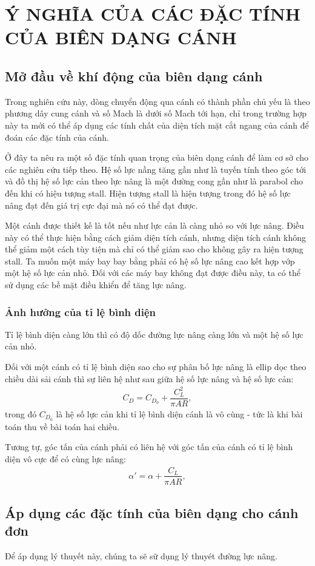 \documentclass[a4paper]{extbook}
\begin{document}
\chapter{Ý NGHĨA CỦA CÁC ĐẶC TÍNH CỦA BIÊN DẠNG CÁNH}

\section{Mở đầu về khí động của biên dạng cánh}

Trong nghiên cứu này, dòng chuyển động qua cánh có thành phần chủ yếu là theo phương dây cung cánh và số Mach là dưới số Mach tới hạn, chỉ trong trường hợp này ta mới có thể áp dụng các tính chất của diện tích mặt cắt ngang của cánh để đoán các đặc tính của cánh.

Ở đây ta nêu ra một số đặc tính quan trọng của biên dạng cánh để làm cơ sở cho các nghiên cứu tiếp theo. Hệ số lực nầng tăng gần như là tuyến tính theo góc tới và đồ thị hệ số lực cản theo lực nâng là một đường cong gần như là parabol cho đến khi có hiệu tượng stall. Hiện tượng stall là hiện tượng trong đó hệ số lực nâng đạt đến giá trị cực đại mà nó có thể đạt được.

Một cánh được thiết kế là tốt nếu như lực cản là càng nhỏ so với lực nâng. Điều này có thể thực hiện bằng cách giảm diện tích cánh, nhưng diện tích cánh không thể giảm một cách tùy tiện mà chỉ có thể giảm sao cho không gây ra hiện tượng stall. Ta muốn một máy bay bay bằng phải có hệ số lực nâng cao kết hợp vớp một hệ số lực cản nhỏ. Đối với các máy bay không đạt được điều này, ta có thể sử dụng các bề mặt điều khiển để tăng lực nâng.

\subsection{Ảnh hưởng của tỉ lệ bình diện}

Tỉ lệ bình diện càng lớn thì có độ dốc đường lực nâng càng lớn và một hệ số lực cản nhỏ. 

Đối với một cánh có tỉ lệ bình diện sao cho sự phân bố lực nâng là ellip dọc theo chiều dài sải cánh thì sự liên hệ như sau giữa hệ số lực nâng và hệ số lực cản:
\begin{align}
    C_D = C_{D_0} + \dfrac{C_L^2}{\pi AR},
\end{align}
trong đó $C_{D_0}$ là hệ số lực cản khi tỉ lệ bình diện cánh là vô cùng - tức là khi bài toán thu về bài toán hai chiều.

Tương tự, góc tấn của cánh phải có liên hệ với góc tấn của cánh có tỉ lệ bình diện vô cực để có cùng lực nâng:
\begin{align}
    \alpha' = \alpha + \dfrac{C_L}{\pi AR},
\end{align}

\section{Áp dụng các đặc tính của biên dạng cho cánh đơn}

Để áp dụng lý thuyết này, chúng ta sẽ sữ dụng lý thuyét đường lực nâng. 
\end{document}
